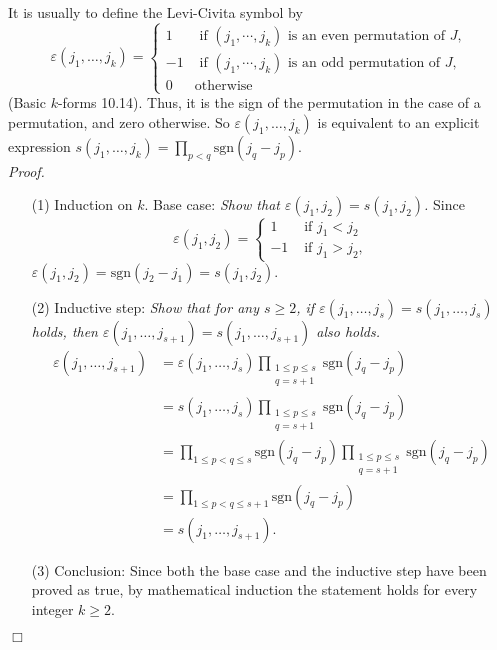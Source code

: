 \documentclass{article}
\begin{document}
It is usually to define the Levi-Civita symbol by
\begin{equation*}
\varepsilon(j_1, \ldots, j_k) =
  \begin{cases}
    1
      & \text{ if $(j_1,\cdots,j_k)$ is an even permutation of $J$}, \\
    -1
      & \text{ if $(j_1,\cdots,j_k)$ is an odd permutation of $J$}, \\
    0
      & \text{otherwise}
  \end{cases}
\end{equation*}
(Basic $k$-forms 10.14).
Thus, it is the sign of the permutation in the case of a permutation, and zero otherwise.
So $\varepsilon(j_1, \ldots, j_k)$ is equivalent to an explicit expression
$s(j_1, \ldots, j_k) = \prod_{p < q} \mathrm{sgn}(j_q - j_p)$. \\



\emph{Proof.}
\begin{enumerate}
\item[(1)]
  Induction on $k$.
  Base case: \emph{Show that $\varepsilon(j_1,j_2) = s(j_1,j_2)$.}
  Since
  \begin{equation*}
  \varepsilon(j_1,j_2) =
    \begin{cases}
      1
        & \text{ if $j_1 < j_2$} \\
      -1
        & \text{ if $j_1 > j_2$},
    \end{cases}
  \end{equation*}
  $\varepsilon(j_1,j_2) = \mathrm{sgn}(j_2-j_1) = s(j_1,j_2)$.

\item[(2)]
  Inductive step: \emph{Show that for any $s \geq 2$,
  if $\varepsilon(j_1, \ldots, j_{s}) = s(j_1, \ldots, j_{s})$ holds,
  then $\varepsilon(j_1, \ldots, j_{s+1}) = s(j_1, \ldots, j_{s+1})$ also holds.}
  \begin{align*}
    \varepsilon(j_1, \ldots, j_{s+1})
    &= \varepsilon(j_1, \ldots, j_{s})
      \prod_{\substack{1 \leq p \leq s \\ q=s+1}} \mathrm{sgn}(j_q-j_p) \\
    &= s(j_1, \ldots, j_{s})
      \prod_{\substack{1 \leq p \leq s \\ q=s+1}} \mathrm{sgn}(j_q-j_p) \\
    &= \prod_{1 \leq p < q \leq s} \mathrm{sgn}(j_q-j_p)
      \prod_{\substack{1 \leq p \leq s \\ q=s+1}} \mathrm{sgn}(j_q-j_p) \\
    &= \prod_{1 \leq p < q \leq s+1} \mathrm{sgn}(j_q - j_p) \\
    &= s(j_1, \ldots, j_{s+1}).
  \end{align*}

\item[(3)]
  Conclusion: Since both the base case and the inductive step have been proved as true,
  by mathematical induction the statement holds for every integer $k \geq 2$.
\end{enumerate}
$\Box$ \\\\
\end{document}
